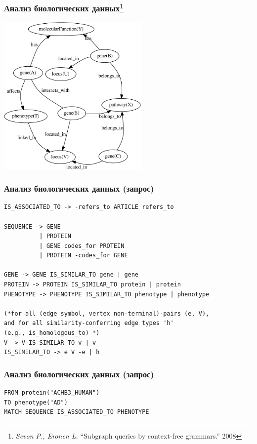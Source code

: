 \documentclass{beamer}
\begin{document}
\begin{frame}[fragile]
  
  \frametitle{Анализ биологических данных\footnote{\emph{Sevon P., Eronen L.} ``Subgraph queries by context-free grammars.'' 2008}}
  \includegraphics[width=0.55\textwidth]{figures/bioDB-crop.pdf}
\end{frame}

\begin{frame}[fragile]
  
  \frametitle{Анализ биологических данных (запрос)}
    \begin{verbatim}
IS_ASSOCIATED_TO -> -refers_to ARTICLE refers_to

SEQUENCE -> GENE 
          | PROTEIN 
          | GENE codes_for PROTEIN 
          | PROTEIN -codes_for GENE

GENE -> GENE IS_SIMILAR_TO gene | gene
PROTEIN -> PROTEIN IS_SIMILAR_TO protein | protein
PHENOTYPE -> PHENOTYPE IS_SIMILAR_TO phenotype | phenotype

(*for all (edge symbol, vertex non-terminal)-pairs (e, V),  
and for all similarity-conferring edge types 'h' 
(e.g., is_homologous_to) *)
V -> V IS_SIMILAR_TO v | v
IS_SIMILAR_TO -> e V -e | h       
    \end{verbatim}
  
\end{frame}

\begin{frame}[fragile]
  
  \frametitle{Анализ биологических данных (запрос)}
    \begin{verbatim}
FROM protein("ACHB3_HUMAN")
TO phenotype("AD")
MATCH SEQUENCE IS_ASSOCIATED_TO PHENOTYPE
    \end{verbatim}
  
\end{frame}
\end{document}
